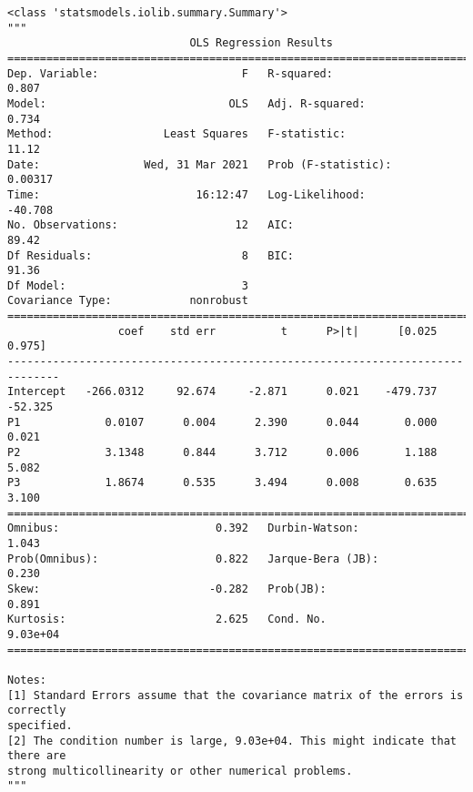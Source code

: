 \documentclass[11pt]{ctexart}
\makeatletter
\newcommand{\boxspacing}{\kern\kvtcb@left@rule\kern\kvtcb@boxsep}
\newcommand{\prompt}[4]{
        {\ttfamily\llap{{\color{#2}[#3]:\hspace{3pt}#4}}\vspace{-\baselineskip}}
    }
\makeatother
\begin{document}
            \begin{tcolorbox}[breakable, size=fbox, boxrule=.5pt, pad at break*=1mm, opacityfill=0]
\prompt{Out}{outcolor}{2}{\boxspacing}
\begin{Verbatim}[commandchars=\\\{\}]
<class 'statsmodels.iolib.summary.Summary'>
"""
                            OLS Regression Results
==============================================================================
Dep. Variable:                      F   R-squared:                       0.807
Model:                            OLS   Adj. R-squared:                  0.734
Method:                 Least Squares   F-statistic:                     11.12
Date:                Wed, 31 Mar 2021   Prob (F-statistic):            0.00317
Time:                        16:12:47   Log-Likelihood:                -40.708
No. Observations:                  12   AIC:                             89.42
Df Residuals:                       8   BIC:                             91.36
Df Model:                           3
Covariance Type:            nonrobust
==============================================================================
                 coef    std err          t      P>|t|      [0.025      0.975]
------------------------------------------------------------------------------
Intercept   -266.0312     92.674     -2.871      0.021    -479.737     -52.325
P1             0.0107      0.004      2.390      0.044       0.000       0.021
P2             3.1348      0.844      3.712      0.006       1.188       5.082
P3             1.8674      0.535      3.494      0.008       0.635       3.100
==============================================================================
Omnibus:                        0.392   Durbin-Watson:                   1.043
Prob(Omnibus):                  0.822   Jarque-Bera (JB):                0.230
Skew:                          -0.282   Prob(JB):                        0.891
Kurtosis:                       2.625   Cond. No.                     9.03e+04
==============================================================================

Notes:
[1] Standard Errors assume that the covariance matrix of the errors is correctly
specified.
[2] The condition number is large, 9.03e+04. This might indicate that there are
strong multicollinearity or other numerical problems.
"""
\end{Verbatim}
\end{tcolorbox}
        
\end{document}
